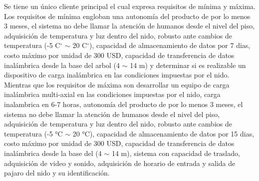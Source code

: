 Se tiene un único cliente principal el cual expresa requisitos de mínima y máxima. Los requisitos de mínima engloban una autonomía del producto de por lo menos 3 meses, el sistema no debe llamar la atención de humanos desde el nivel del piso, adquisición de temperatura y luz dentro del nido, robusto ante cambios de temperatura (-5 C$^{\circ}$ $\sim$ 20 C$^{\circ}$), capacidad de almacenamiento de datos por 7 dias, costo máximo por unidad de 300 USD, capacidad de transferencia de datos inalámbrica desde la base del arbol (4 $\sim$ 14 m) y determinar si es realizable un dispositivo de carga inalámbrica en las condiciones impuestas por el nido. Mientras que los requisitos de máxima son 
desarrollar un equipo de carga inalámbrica multi-axial en las condiciones impuestas por el nido, carga inalambrica en 6-7 horas, autonomía del producto de por lo menos 3 meses, el sistema no debe llamar la atención de humanos desde el nivel del piso, adquisición de temperatura y luz dentro del nido, robusto ante cambios de temperatura (-5 °C $\sim$ 20 °C), capacidad de almacenamiento de datos por 15 dias, costo máximo por unidad de 300 USD, capacidad de transferencia de datos inalámbrica desde la base del   (4 $\sim$ 14 m), sistema con capacidad de traslado, adquisición de video y sonido, adquisición de horario de entrada y salida de pajaro del nido y su identificación.


\label{sec:RelevamientoDatos}


\label{sec:CasaCalidad}


\label{sec:RequerimientosTrazabilidad}

